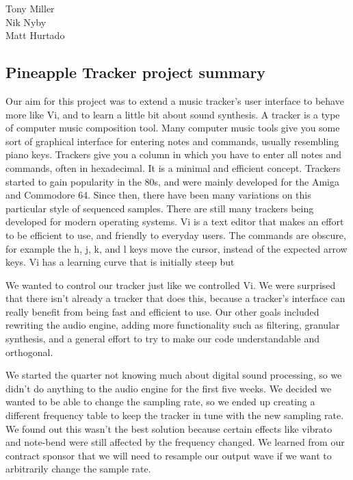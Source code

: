 \documentclass[12pt,letterpaper]{article}
\begin{document}
\begin{flushright}
Tony Miller\\
Nik Nyby\\
Matt Hurtado
\end{flushright}

\begin{center}
\section*{Pineapple Tracker project summary}
\end{center}


\doublespacing
\par
Our aim for this project was to extend a music tracker's user interface to behave more like Vi, and to learn a little bit about sound synthesis. A tracker is a type of computer music composition tool. Many computer music tools give you some sort of graphical interface for entering notes and commands, usually resembling piano keys. Trackers give you a column in which you have to enter all notes and commands, often in hexadecimal. It is a minimal and efficient concept. Trackers started to gain popularity in the 80s, and were mainly developed for the Amiga and Commodore 64. Since then, there have been many variations on this particular style of sequenced samples. There are still many trackers being developed for modern operating systems. Vi is a text editor that makes an effort to be efficient to use, and friendly to everyday users. The commands are obscure, for example the h, j, k, and l keys move the cursor, instead of the expected arrow keys. Vi has a learning curve that is initially steep but 

\par
We wanted to control our tracker just like we controlled Vi. We were surprised that there isn't already a tracker that does this, because a tracker's interface can really benefit from being fast and efficient to use. Our other goals included rewriting the audio engine, adding more functionality such as filtering, granular synthesis, and a general effort to try to make our code understandable and orthogonal.

\par
We started the quarter not knowing much about digital sound processing, so we didn't do anything to the audio engine for the first five weeks. We decided we wanted to be able to change the sampling rate, so we ended up creating a different frequency table to keep the tracker in tune with the new sampling rate. We found out this wasn't the best solution because certain effects like vibrato and note-bend were still affected by the frequency changed. We learned from our contract sponsor that we will need to resample our output wave if we want to arbitrarily change the sample rate.
\end{document}

